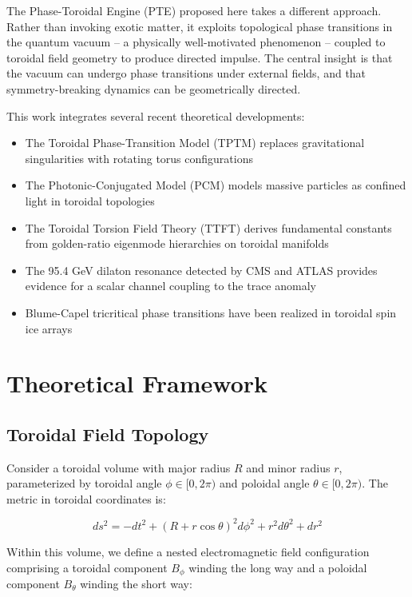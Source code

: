 \documentclass[12pt,a4paper]{article}
\begin{document}
The Phase-Toroidal Engine (PTE) proposed here takes a different approach. Rather than invoking exotic matter, it exploits topological phase transitions in the quantum vacuum -- a physically well-motivated phenomenon -- coupled to toroidal field geometry to produce directed impulse. The central insight is that the vacuum can undergo phase transitions under external fields, and that symmetry-breaking dynamics can be geometrically directed.

This work integrates several recent theoretical developments:
\begin{itemize}
    \item The Toroidal Phase-Transition Model (TPTM) replaces gravitational singularities with rotating torus configurations~\cite{weinstock2026}
    \item The Photonic-Conjugated Model (PCM) models massive particles as confined light in toroidal topologies~\cite{caputo2025}
    \item The Toroidal Torsion Field Theory (TTFT) derives fundamental constants from golden-ratio eigenmode hierarchies on toroidal manifolds~\cite{zero2025}
    \item The 95.4 GeV dilaton resonance detected by CMS and ATLAS provides evidence for a scalar channel coupling to the trace anomaly~\cite{hofseth2026}
    \item Blume-Capel tricritical phase transitions have been realized in toroidal spin ice arrays~\cite{blume2025}
\end{itemize}

\section{Theoretical Framework}

\subsection{Toroidal Field Topology}

Consider a toroidal volume with major radius $R$ and minor radius $r$, parameterized by toroidal angle $\phi \in [0, 2\pi)$ and poloidal angle $\theta \in [0, 2\pi)$. The metric in toroidal coordinates is:

\begin{equation}
ds^2 = -dt^2 + (R + r\cos\theta)^2 d\phi^2 + r^2 d\theta^2 + dr^2
\label{eq:metric}
\end{equation}

Within this volume, we define a nested electromagnetic field configuration comprising a toroidal component $B_\phi$ winding the long way and a poloidal component $B_\theta$ winding the short way:
\end{document}
